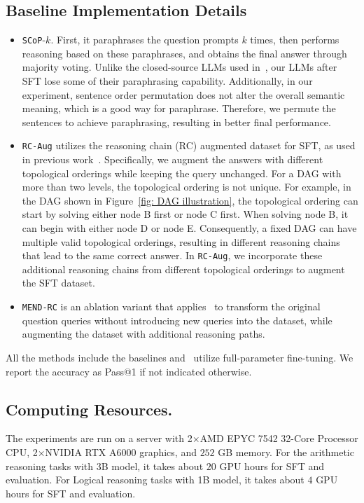 
\subsection{Baseline Implementation Details}
\begin{itemize}
    \item \texttt{SCoP}-$k$. First, it paraphrases the question prompts \( k \) times, then performs reasoning based on these paraphrases, and obtains the final answer through majority voting. Unlike the closed-source LLMs used in~\cite{zhou2024paraphrase}, our LLMs after SFT lose some of their paraphrasing capability. Additionally, in our experiment, sentence order permutation does not alter the overall semantic meaning, which is a good way for paraphrase. Therefore, we permute the sentences to achieve paraphrasing, resulting in better final performance.

    \item \texttt{RC-Aug} utilizes the reasoning chain (RC) augmented dataset for SFT, as used in previous work~\citep{yu2023metamath}. Specifically, we augment the answers with different topological orderings while keeping the query unchanged. For a DAG with more than two levels, the topological ordering is not unique. For example, in the DAG shown in Figure~\ref{fig: DAG illustration}, the topological ordering can start by solving either node B first or node C first. When solving node B, it can begin with either node D or node E. Consequently, a fixed DAG can have multiple valid topological orderings, resulting in different reasoning chains that lead to the same correct answer. In \texttt{RC-Aug}, we incorporate these additional reasoning chains from different topological orderings to augment the SFT dataset.

    \item \texttt{MEND-RC} is an ablation variant that applies \method\ to transform the original question queries without introducing new queries into the dataset, while augmenting the dataset with additional reasoning paths.
\end{itemize}

All the methods include the baselines and \method\ utilize full-parameter fine-tuning. We report the accuracy as Pass@1 if not indicated otherwise.

\subsection{Computing Resources.}
The experiments are run on a server with 2$\times$AMD EPYC 7542 32-Core Processor CPU, 2$\times$NVIDIA RTX A6000 graphics, and $252$ GB memory. For the arithmetic reasoning tasks with 3B model, it takes about $20$ GPU hours for SFT and evaluation. For Logical reasoning tasks with 1B model, it takes about $4$ GPU hours for SFT and evaluation.

